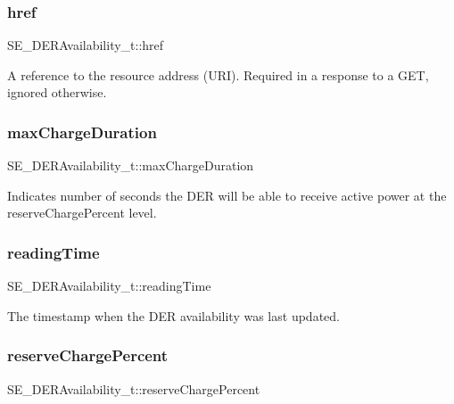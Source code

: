 \subsubsection{\texorpdfstring{href}{href}}
{\footnotesize\ttfamily S\+E\+\_\+\+D\+E\+R\+Availability\+\_\+t\+::href}

A reference to the resource address (U\+RI). Required in a response to a G\+ET, ignored otherwise. \mbox{\label{group__DERAvailability_ga1bb60a9e730bcf975b7a925dc5875136}} 
\subsubsection{\texorpdfstring{max\+Charge\+Duration}{maxChargeDuration}}
{\footnotesize\ttfamily S\+E\+\_\+\+D\+E\+R\+Availability\+\_\+t\+::max\+Charge\+Duration}

Indicates number of seconds the D\+ER will be able to receive active power at the reserve\+Charge\+Percent level. \mbox{\label{group__DERAvailability_gafd14159c0b528ff888f15c999908eee9}} 
\subsubsection{\texorpdfstring{reading\+Time}{readingTime}}
{\footnotesize\ttfamily S\+E\+\_\+\+D\+E\+R\+Availability\+\_\+t\+::reading\+Time}

The timestamp when the D\+ER availability was last updated. \mbox{\label{group__DERAvailability_ga1d323d90b7f839ca0c5c2fd243bf5a8e}} 
\subsubsection{\texorpdfstring{reserve\+Charge\+Percent}{reserveChargePercent}}
{\footnotesize\ttfamily S\+E\+\_\+\+D\+E\+R\+Availability\+\_\+t\+::reserve\+Charge\+Percent}

